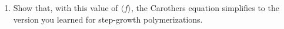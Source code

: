 \begin{activity}
\begin{exercises}
\begin{enumerate}
			\item Show that, with this value of $\langle f\rangle$, the Carothers equation simplifies to the version you learned for step-growth polymerizations.
		\end{enumerate}	
	
\end{exercises}


%
%	


	
\end{activity}